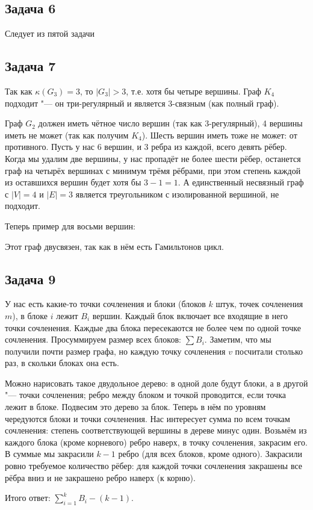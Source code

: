 \subsection{Задача 6}
	Следует из пятой задачи

\subsection{Задача 7}
	Так как $\kappa(G_3)=3$, то $|G_3|>3$, т.е. хотя бы четыре вершины.
	Граф $K_4$ подходит "--- он три-регулярный и является 3-связным (как полный граф).

	Граф $G_2$ должен иметь чётное число вершин (так как 3-регулярный), 4 вершины
	иметь не может (так как получим $K_4$).
	Шесть вершин иметь тоже не может: от противного.
	Пусть у нас 6 вершин, и 3 ребра из каждой, всего девять рёбер.
	Когда мы удалим две вершины, у нас пропадёт не более шести рёбер,
	останется граф на четырёх вершинах с минимум трёмя рёбрами,
	при этом степень каждой из оставшихся вершин будет хотя бы $3-1=1$.
	А единственный несвязный граф с $|V|=4$ и $|E|=3$ является треугольником с изолированной вершиной, не подходит.

	Теперь пример для восьми вершин:

	\begin{center}
	\end{center}

	Этот граф двусвязен, так как в нём есть Гамильтонов цикл.

\subsection{Задача 9}
	У нас есть какие-то точки сочленения и блоки (блоков $k$ штук, точек сочленения $m$),
	в блоке $i$ лежит $B_i$ вершин.
	Каждый блок включает все входящие в него точки сочленения.
	Каждые два блока пересекаются не более чем по одной точке сочленения.
	Просуммируем размер всех блоков: $\sum B_i$.
	Заметим, что мы получили почти размер графа, но каждую точку сочленения $v$
	посчитали столько раз, в скольки блоках она есть.

	Можно нарисовать такое двудольное дерево: в одной доле будут блоки,
	а в другой "--- точки сочленения; ребро между блоком и точкой проводится,
	если точка лежит в блоке.
	Подвесим это дерево за блок.
	Теперь в нём по уровням чередуются блоки и точки сочленения.
	Нас интересует сумма по всем точкам сочленения: степень соответствующей вершины в дереве минус один.
	Возьмём из каждого блока (кроме корневого) ребро наверх, в точку сочленения, закрасим его.
	В суммые мы закрасили $k-1$ ребро (для всех блоков, кроме одного).
	Закрасили ровно требуемое количество рёбер: для каждой точки сочленения закрашены все рёбра
	вниз и не закрашено ребро наверх (к корню).

	Итого ответ: $\sum_{i=1}^k B_i - (k - 1)$.
